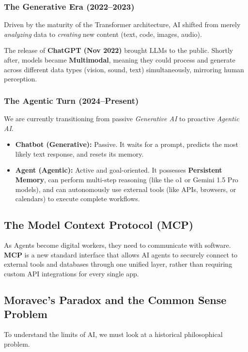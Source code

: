 \documentclass[11pt]{article}
\theoremstyle{smallexample}
\begin{document}
\subsubsection{The Generative Era (2022--2023)}
Driven by the maturity of the Transformer architecture, AI shifted from merely \textit{analyzing} data to \textit{creating} new content (text, code, images, audio). 

The release of \textbf{ChatGPT (Nov 2022)} brought LLMs to the public. Shortly after, models became \textbf{Multimodal}, meaning they could process and generate across different data types (vision, sound, text) simultaneously, mirroring human perception.

\subsubsection{The Agentic Turn (2024--Present)}
We are currently transitioning from passive \textit{Generative AI} to proactive \textit{Agentic AI}. 

\begin{itemize}
    \item \textbf{Chatbot (Generative):} Passive. It waits for a prompt, predicts the most likely text response, and resets its memory.
    \item \textbf{Agent (Agentic):} Active and goal-oriented. It possesses \textbf{Persistent Memory}, can perform multi-step reasoning (like the o1 or Gemini 1.5 Pro models), and can autonomously use external tools (like APIs, browsers, or calendars) to execute complete workflows.
\end{itemize}

\subsection{The Model Context Protocol (MCP)}
As Agents become digital workers, they need to communicate with software. \textbf{MCP} is a new standard interface that allows AI agents to securely connect to external tools and databases through one unified layer, rather than requiring custom API integrations for every single app.

\pagebreak
\subsection{Moravec's Paradox and the Common Sense Problem}
To understand the limits of AI, we must look at a historical philosophical problem. 
\end{document}
